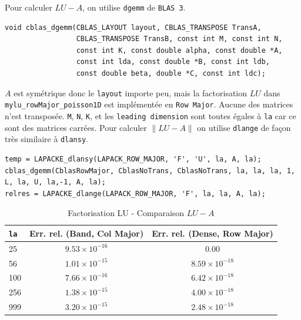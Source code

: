 \documentclass{article}
\begin{document}
Pour calculer $LU-A$, on utilise \texttt{dgemm} de \texttt{BLAS 3}.
\begin{scriptsize}
\begin{verbatim}
void cblas_dgemm(CBLAS_LAYOUT layout, CBLAS_TRANSPOSE TransA,
                 CBLAS_TRANSPOSE TransB, const int M, const int N,
                 const int K, const double alpha, const double *A,
                 const int lda, const double *B, const int ldb,
                 const double beta, double *C, const int ldc);
\end{verbatim}
\end{scriptsize}
$A$ est symétrique donc le \texttt{layout} importe peu, mais la factorisation $LU$ dans \texttt{mylu\_rowMajor\_poisson1D} est implémentée en \texttt{Row Major}. Aucune des matrices n'est transposée. \texttt{M}, \texttt{N}, \texttt{K}, et les \texttt{leading dimension} sont toutes égales à \texttt{la} car ce sont des matrices carrées.  
Pour calculer \( \lVert LU-A \rVert \) on utilise \texttt{dlange} de façon très similaire à \texttt{dlansy}.
\begin{scriptsize}
\begin{verbatim}
temp = LAPACKE_dlansy(LAPACK_ROW_MAJOR, 'F', 'U', la, A, la);
cblas_dgemm(CblasRowMajor, CblasNoTrans, CblasNoTrans, la, la, la, 1, L, la, U, la,-1, A, la);
relres = LAPACKE_dlange(LAPACK_ROW_MAJOR, 'F', la, la, A, la);
\end{verbatim}
\end{scriptsize}\begin{table}[H]
\caption{Factorisation LU - Comparaison $LU - A$}
\centering
\renewcommand*\arraystretch{1.1}
\begin{tabular}{|l|c|c|}
  \hline
  \texttt{la} & Err. rel. (Band, Col Major) & Err. rel. (Dense, Row Major) \\
  \hline
	25	&	\(9.53 \times 10^{-16}\)	&	\(0.00\) \\
	56	&	\(1.01 \times 10^{-15}\)	&	\(8.59 \times 10^{-18}\) \\
	100	&	\(7.66 \times 10^{-16}\)	&	\(6.42 \times 10^{-18}\) \\
	256	&	\(1.38 \times 10^{-15}\)	&	\(4.00 \times 10^{-18}\) \\
	999	&	\(3.20 \times 10^{-15}\)	&	\(2.48 \times 10^{-18}\) \\
  \hline
\end{tabular}
\end{table}
\end{document}
